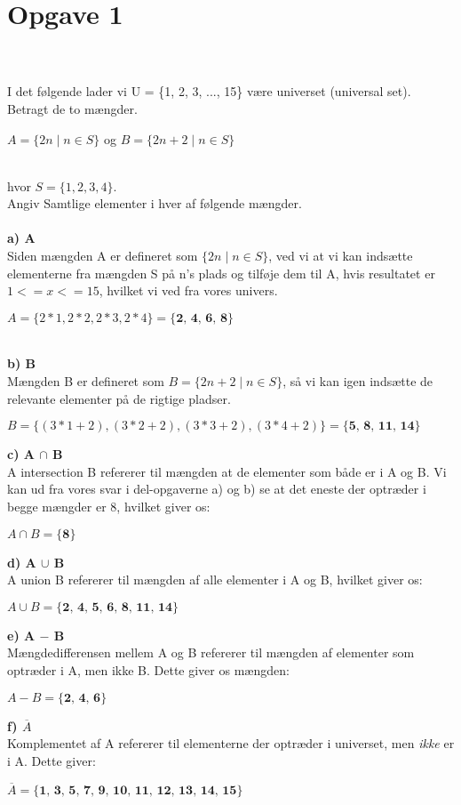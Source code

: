 \section{Opgave 1}

\\
\\
I det følgende lader vi U = \{1, 2, 3, ..., 15\} være universet (universal set).
\\
Betragt de to mængder.
\begin{center}
    \( A = \{ 2n \mid n \in S \} \) og \( B = \{ 2n + 2 \mid n \in S \} \)
\end{center}
\\
hvor \(S = \{1, 2, 3, 4\}.\)
\\
Angiv Samtlige elementer i hver af følgende mængder.
\\
\\
\textbf{a) A}\\
Siden mængden A er defineret som \(\{ 2n \mid n \in S \}\), ved vi at vi kan indsætte elementerne fra mængden S på n's plads og tilføje dem til A, hvis resultatet er \(1 <= x <= 15\), hvilket vi ved fra vores univers.
\begin{center}
\(A = \{2*1, 2*2, 2*3, 2*4\} = \textbf{\{2, 4, 6, 8\}}\) \\
\end{center}
\\
\textbf{b) B}\\
Mængden B er defineret som \(B = \{2n + 2 \mid n \in S\}\), så vi kan igen indsætte de relevante elementer på de rigtige pladser. 
\begin{center}
    \(B = \{(3*1+2), (3*2+2), (3*3+2), (3*4+2)\} = \textbf{\{5, 8, 11, 14\}}\)
\end{center}
\textbf{c) A \(\cap\) B}\\
A intersection B refererer til mængden at de elementer som både er i A og B. Vi kan ud fra vores svar i del-opgaverne a) og b) se at det eneste der optræder i begge mængder er 8, hvilket giver os: 
\begin{center}
    \(A \cap B = \textbf{\{8\}}\) \\
\end{center}
\textbf{d) A \(\cup\) B}\\
A union B refererer til mængden af alle elementer i A og B, hvilket giver os: 
\begin{center}
    \(A \cup B = \textbf{\{2, 4, 5, 6, 8, 11, 14\}}\)
\end{center}
\textbf{e) A \( - \) B}\\
Mængdedifferensen mellem A og B refererer til mængden af elementer som optræder i A, men ikke B. Dette giver os mængden:
\begin{center}
    \(A - B = \textbf{\{2, 4, 6\}}\)
\end{center}
\textbf{f) \(\overline{A}\)} \\
Komplementet af A refererer til elementerne der optræder i universet, men \textit{ikke} er i A. Dette giver:
\begin{center}
    \(\overline{A} = \textbf{\{1, 3, 5, 7, 9, 10, 11, 12, 13, 14, 15\}}\)
\end{center}
\\
\\